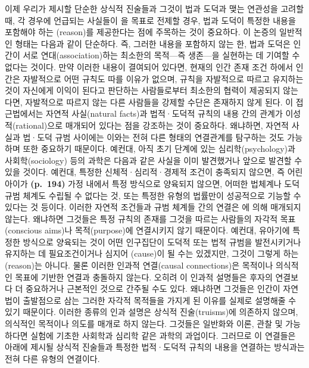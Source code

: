 이제 우리가 제시할 단순한 상식적 진술들과 그것이 법과 도덕과 맺는
연관성을 고려할 때, 각 경우에 언급되는 사실들이 을 목표로
전제할 경우, 법과 도덕이 특정한 내용을 포함해야 하는
(reason)를 제공한다는 점에 주목하는 것이 중요하다. 이 논증의
일반적인 형태는 다음과 같이 단순하다. 즉, 그러한 내용을 포함하지 않는
한, 법과 도덕은 인간이 서로 연대(association)하는 최소한의 목적---즉
생존---을 실현하는 데 기여할 수 없다는 것이다. 만약 이러한 내용이
결여되어 있다면, 현재의 인간 존재 조건 하에서 인간은 자발적으로 어떤
규칙도 따를 이유가 없으며, 규칙을 자발적으로 따르고 유지하는 것이
자신에게 이익이 된다고 판단하는 사람들로부터 최소한의 협력이 제공되지
않는다면, 자발적으로 따르지 않는 다른 사람들을 강제할 수단은 존재하지
않게 된다. 이 접근법에서는 자연적 사실(natural facts)과 법적·도덕적
규칙의 내용 간의 관계가 이성적(rational)으로 매개되어 있다는 점을
강조하는 것이 중요하다. 왜냐하면, 자연적 사실과 법·도덕 규범 사이에는
이와는 전혀 다른 형태의 연결관계를 탐구하는 것도 가능하며 또한 중요하기
때문이다. 예컨대, 아직 초기 단계에 있는 심리학(psychology)과
사회학(sociology) 등의 과학은 다음과 같은 사실을 이미 발견했거나 앞으로
발견할 수 있을 것이다. 예컨대, 특정한 신체적·심리적·경제적 조건이
충족되지 않으면, 즉 어린아이가 \textbf{(p.~194)} 가정 내에서 특정
방식으로 양육되지 않으면, 어떠한 법체계나 도덕규범 체계도 수립될 수
없다는 것, 또는 특정한 유형의 법률만이 성공적으로 기능할 수 있다는 것
등이다. 이러한 자연적 조건들과 규범 체계들 간의 연결은
에 의해 매개되지 않는다. 왜냐하면 그것들은 특정
규칙의 존재를 그것을 따르는 사람들의 자각적 목표(conscious aims)나
목적(purpose)에 연결시키지 않기 때문이다. 예컨대, 유아기에 특정한
방식으로 양육되는 것이 어떤 인구집단이 도덕적 또는 법적 규범을
발전시키거나 유지하는 데 필요조건이거나 심지어 (cause)이 될
수는 있겠지만, 그것이 그렇게 하는 (reason)는 아니다. 물론
이러한 인과적 연결(causal connections)은 목적이나 의식적인 목표에 기반한
연결과 충돌하지 않는다. 오히려 이 인과적 설명들은 후자의 연결보다 더
중요하거나 근본적인 것으로 간주될 수도 있다. 왜냐하면 그것들은 인간이
자연법이 출발점으로 삼는 그러한 자각적 목적들을 가지게 된 이유를 실제로
설명해줄 수 있기 때문이다. 이러한 종류의 인과 설명은 상식적
진술(truisms)에 의존하지 않으며, 의식적인 목적이나 의도를 매개로 하지
않는다. 그것들은 일반화와 이론, 관찰 및 가능하다면 실험에 기초한
사회학과 심리학 같은 과학의 과업이다. 그러므로 이 연결들은 아래에 제시될
상식적 진술들과 특정한 법적·도덕적 규칙의 내용을 연결하는 방식과는 전혀
다른 유형의 연결이다.

